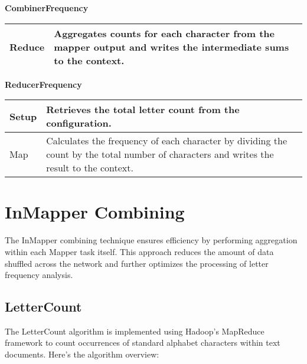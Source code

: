 \textbf{CombinerFrequency}
\begin{longtable}{|>{\raggedright\arraybackslash}p{}|>{\raggedright\arraybackslash}p{}|}
    \hline
    Reduce & Aggregates counts for each character from the mapper output and writes the intermediate sums to the context.\\
    \hline
\end{longtable}

\textbf{ReducerFrequency}
\begin{longtable}{|>{\raggedright\arraybackslash}p{}|>{\raggedright\arraybackslash}p{}|}
    \hline
    Setup & Retrieves the total letter count from the configuration. \\
    \hline
    Map & Calculates the frequency of each character by dividing the count by the total number of characters and writes the result to the context.\\
    \hline
\end{longtable}



\section{InMapper Combining}
The InMapper combining technique ensures efficiency by performing aggregation within each Mapper task itself. This approach reduces the amount of data shuffled across the network and further optimizes the processing of letter frequency analysis.


\subsection{LetterCount}

The LetterCount algorithm is implemented using Hadoop's MapReduce framework to count occurrences of standard alphabet characters within text documents. Here’s the algorithm overview:


